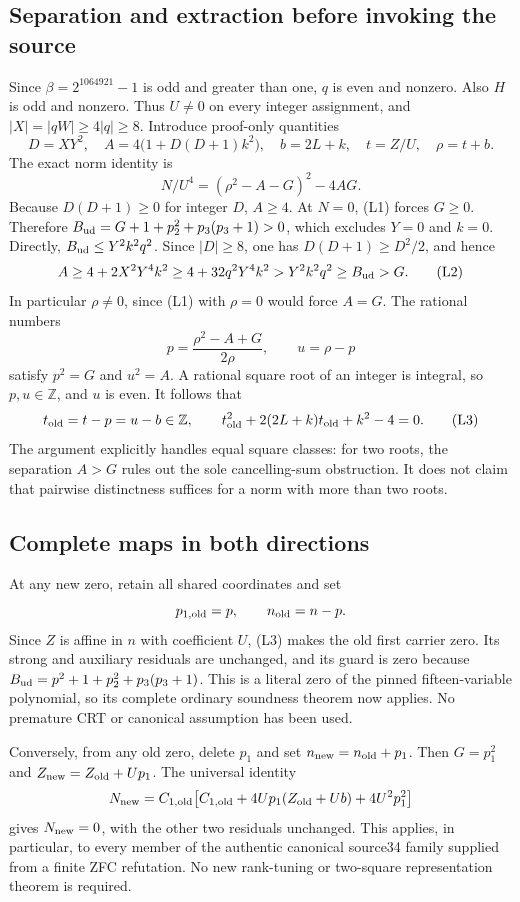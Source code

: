 \documentclass[11pt]{article}
\begin{document}
\subsection{Separation and extraction before invoking the source}
Since $\beta=2^{1064921}-1$ is odd and greater than one, $q$ is even and nonzero.
Also $H$ is odd and nonzero. Thus $U\ne0$ on every integer assignment, and
$|X|=|qW|\ge4|q|\ge8$.
Introduce proof-only quantities
\[
 D=XY^2,\quad A=4\bigl(1+D(D+1)k^2\bigr),\quad
 b=2L+k,\quad t=Z/U,\quad\rho=t+b.
\]
The exact norm identity is
\[
 N/U^4=(\rho^2-A-G)^2-4AG. \tag{L1}
\]
Because $D(D+1)\ge0$ for integer $D$, $A\ge4$. At $N=0$, (L1) forces
$G\ge0$. Therefore $B_{\rm ud}=G+1+p_2^2+p_3(p_3+1)>0$, which excludes
$Y=0$ and $k=0$. Directly, $B_{\rm ud}\le Y^2k^2q^2$. Since
$|D|\ge8$, one has $D(D+1)\ge D^2/2$, and hence
\[
 A\ge4+2X^2Y^4k^2\ge4+32q^2Y^4k^2
   >Y^2k^2q^2\ge B_{\rm ud}>G. \tag{L2}
\]
In particular $\rho\ne0$, since (L1) with $\rho=0$ would force $A=G$.
The rational numbers
\[
 p=\frac{\rho^2-A+G}{2\rho},\qquad u=\rho-p
\]
satisfy $p^2=G$ and $u^2=A$. A rational square root of an integer is integral,
so $p,u\in\mathbb Z$, and $u$ is even. It follows that
\[
 t_{\rm old}=t-p=u-b\in\mathbb Z,\qquad
 t_{\rm old}^2+2(2L+k)t_{\rm old}+k^2-4=0. \tag{L3}
\]
The argument explicitly handles equal square classes: for two roots, the
separation $A>G$ rules out the sole cancelling-sum obstruction. It does not
claim that pairwise distinctness suffices for a norm with more than two roots.

\subsection{Complete maps in both directions}
At any new zero, retain all shared coordinates and set
\[
 p_{1,\rm old}=p,\qquad n_{\rm old}=n-p.
\]
Since $Z$ is affine in $n$ with coefficient $U$, (L3) makes the old first carrier
zero. Its strong and auxiliary residuals are unchanged, and its guard is zero
because $B_{\rm ud}=p^2+1+p_2^2+p_3(p_3+1)$. This is a literal zero of the
pinned fifteen-variable polynomial, so its complete ordinary soundness theorem
now applies. No premature CRT or canonical assumption has been used.

Conversely, from any old zero, delete $p_1$ and set
$n_{\rm new}=n_{\rm old}+p_1$. Then $G=p_1^2$ and
$Z_{\rm new}=Z_{\rm old}+Up_1$. The universal identity
\[
 N_{\rm new}=C_{1,\rm old}
 \bigl[C_{1,\rm old}+4Up_1(Z_{\rm old}+Ub)+4U^2p_1^2\bigr]
\]
gives $N_{\rm new}=0$, with the other two residuals unchanged.
This applies, in particular, to every member of the authentic canonical source34
family supplied from a finite ZFC refutation. No new rank-tuning or two-square
representation theorem is required.
\end{document}
